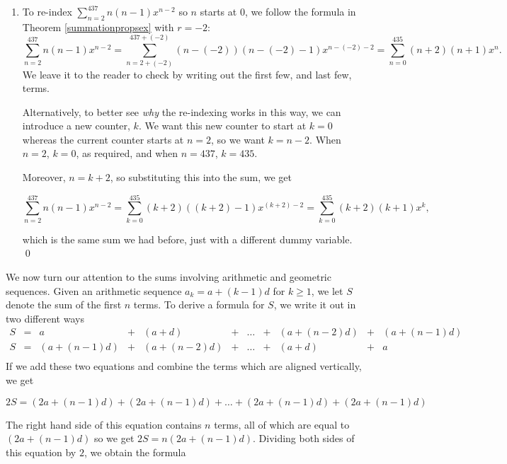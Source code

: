 \documentclass{ximera}
\begin{document}
\begin{example}
\begin{enumerate}
which gives  $a_{21} = \displaystyle{ \sum_{n=1}^{21}  a_{n}  - \sum_{n=1}^{20}  a_{n}  = 7-(-3) = 10}$ as well.

\item To re-index $\displaystyle{ \sum_{n=2}^{437} n (n-1) x^{n-2}}$ so $n$ starts at $0$,  we follow the formula in Theorem \ref{summationpropsex}  with $r=-2$:  \[ \sum_{n=2}^{437} n (n-1) x^{n-2} =  \sum_{n=2+(-2)}^{437+(-2)} (n-(-2)) (n-(-2)-1) x^{n -(-2) -2} = \sum_{n=0}^{435} (n+2) (n+1) x^{n}. \]  We leave it to the reader to check by writing out the first few, and last few, terms.

Alternatively, to better see \textit{why} the re-indexing works in this way, we can introduce a new counter, $k$.  We want this new counter to start at $k =0$ whereas the current counter starts at $n=2$, so we want $k = n-2$.   When $n=2$, $k=0$, as required, and when $n=437$, $k = 435$.  

Moreover, $n = k+2$, so substituting this into the sum, we get 

 \[ \sum_{n=2}^{437} n (n-1) x^{n-2} =  \sum_{k=0}^{435} (k+2) ((k+2)-1) x^{(k+2) -2} = \sum_{k=0}^{435} (k+2) (k+1) x^{k}, \] 

which is the same sum we had before, just with a different dummy variable. \qed

\end{enumerate}


\end{example}


We now turn our attention to the sums involving arithmetic and geometric sequences. Given an arithmetic sequence $a_{k} = a + (k-1) d$ for $k \geq 1$, we let $S$ denote the sum of the first $n$ terms. To derive a formula for $S$, we write it out in two different ways \[ \begin{array}{ccccccccccc}

S & = & a & + & (a + d) &  + & \ldots & + & (a + (n-2)d) & + & (a + (n-1)d) \\ 

S & = & (a + (n-1)d) & + & (a + (n-2)d)  & + & \ldots & + & (a + d)  & + & a \\

\end{array}\] If we add these two equations and combine the terms which are aligned vertically, we get 

\[2S = (2a + (n-1)d) + (2a + (n-1)d) + \ldots + (2a + (n-1)d) + (2a + (n-1)d)\]


The right hand side of this equation contains $n$ terms, all of  which are equal to $(2a + (n-1)d)$ so we get $2S = n(2a + (n-1)d)$.  Dividing both sides of this equation by $2$, we obtain the formula
\end{document}
